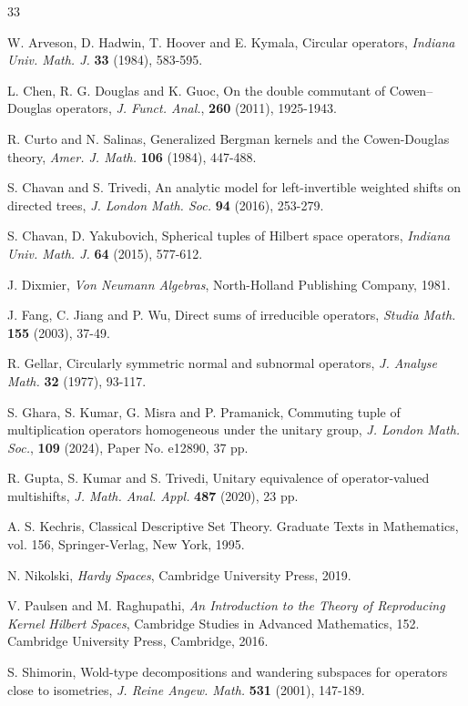 \documentclass[a4paper,oneside,10pt, reqno]{amsproc}
\theoremstyle{remark}
\theoremstyle{definition}
\begin{document}
\begin{thebibliography}{33}

W. Arveson, D. Hadwin, T. Hoover and E. Kymala, Circular operators, {\it Indiana Univ. Math. J.} {\bf 33} (1984), 583-595.

L. Chen, R. G. Douglas and K. Guoc, On the double commutant of Cowen–Douglas operators, {\it J. Funct. Anal.}, {\bf 260} (2011), 1925-1943.

R. Curto and N. Salinas, Generalized Bergman kernels and the Cowen-Douglas theory, {\it Amer. J. Math.} {\bf 106} (1984), 447-488.

S. Chavan and S. Trivedi, An analytic model for left-invertible
weighted shifts on directed trees, {\it J. London Math. Soc.} {\bf 94} (2016), 253-279.

S. Chavan, D. Yakubovich, Spherical tuples of Hilbert space operators,
{\it Indiana Univ. Math. J.} {\bf 64} (2015), 577-612.

J. Dixmier, {\it Von Neumann Algebras}, North-Holland Publishing Company, 1981.

J. Fang, C. Jiang and P. Wu, Direct sums of irreducible operators, {\it Studia Math.} {\bf 155} (2003), 37-49. 

R. Gellar, Circularly symmetric normal and subnormal operators, {\it J. Analyse Math.} {\bf 32} (1977), 93-117.

S. Ghara, S. Kumar, G. Misra and P. Pramanick, Commuting tuple of multiplication operators homogeneous under the unitary group, {\it J. London Math. Soc.}, {\bf 109} (2024), Paper No. e12890, 37 pp.

R. Gupta, S. Kumar and S. Trivedi, Unitary equivalence of operator-valued multishifts, {\it J. Math. Anal. Appl.} {\bf 487} (2020), 23 pp.

A. S. Kechris, Classical Descriptive Set Theory. Graduate Texts in Mathematics, vol. 156, Springer-Verlag, New York, 1995.

N. Nikolski, {\it Hardy Spaces}, Cambridge University Press, 2019.

V. Paulsen and M. Raghupathi, {\it An Introduction to the Theory of Reproducing Kernel Hilbert Spaces}, Cambridge Studies in Advanced Mathematics, 152. Cambridge University Press, Cambridge, 2016.

S. Shimorin, Wold-type decompositions and wandering subspaces for operators
close to isometries, {\it J. Reine Angew. Math.} {\bf 531} (2001), 147-189.



\end{thebibliography}
\end{document}
